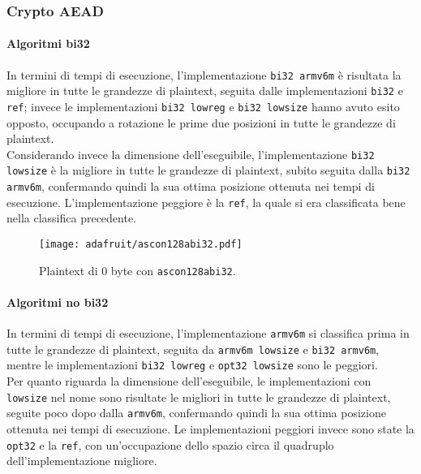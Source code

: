 \subsubsection{Crypto AEAD}

\paragraph{Algoritmi bi32}

In termini di tempi di esecuzione, l'implementazione \texttt{bi32 armv6m} è risultata la migliore in tutte le grandezze di plaintext, seguita dalle implementazioni \texttt{bi32} e \texttt{ref}; invece le implementazioni \texttt{bi32 lowreg} e \texttt{bi32 lowsize} hanno avuto esito opposto, occupando a rotazione le prime due posizioni in tutte le grandezze di plaintext. \\

\noindent Considerando invece la dimensione dell'eseguibile, l'implementazione \texttt{bi32 lowsize} è la migliore in tutte le grandezze di plaintext, subito seguita dalla \texttt{bi32 armv6m}, confermando quindi la sua ottima posizione ottenuta nei tempi di esecuzione. L'implementazione peggiore è la \texttt{ref}, la quale si era classificata bene nella classifica precedente.

\begin{figure}[H]
    \centering
    \texttt{[image: adafruit/ascon128abi32.pdf]}
    \caption{Plaintext di 0 byte con \texttt{ascon128abi32}.}
\end{figure}

\paragraph{Algoritmi no bi32}

In termini di tempi di esecuzione, l'implementazione \texttt{armv6m} si classifica prima in tutte le grandezze di plaintext, seguita da \texttt{armv6m lowsize} e \texttt{bi32 armv6m}, mentre le implementazioni \texttt{bi32 lowreg} e \texttt{opt32 lowsize} sono le peggiori. \\

\noindent Per quanto riguarda la dimensione dell'eseguibile, le implementazioni con \texttt{lowsize} nel nome sono risultate le migliori in tutte le grandezze di plaintext, seguite poco dopo dalla \texttt{armv6m}, confermando quindi la sua ottima posizione ottenuta nei tempi di esecuzione. Le implementazioni peggiori invece sono state la \texttt{opt32} e la \texttt{ref}, con un'occupazione dello spazio circa il quadruplo dell'implementazione migliore.

